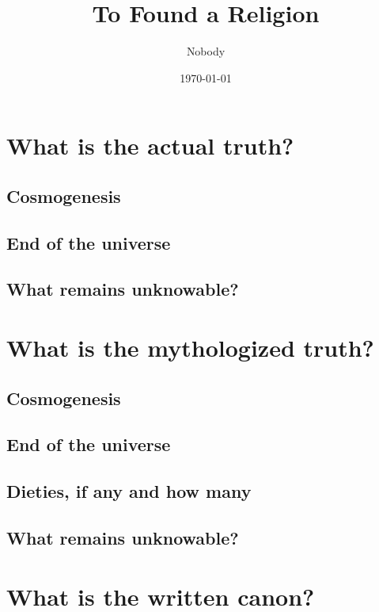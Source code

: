 \documentclass[12pt, letterpaper]{article}
\begin{document}
 
\title{To Found a Religion}
 \date{\today}
\author{Nobody}  
\maketitle



\section{What is the actual truth?}

\subsection{Cosmogenesis}

\subsection{End of the universe}

\subsection{What remains unknowable?}

\section{What is the mythologized truth?}

\subsection{Cosmogenesis}

\subsection{End of the universe}

\subsection{Dieties, if any and how many}

\subsection{What remains unknowable?}

\section{What is the written canon?}
\end{document}

